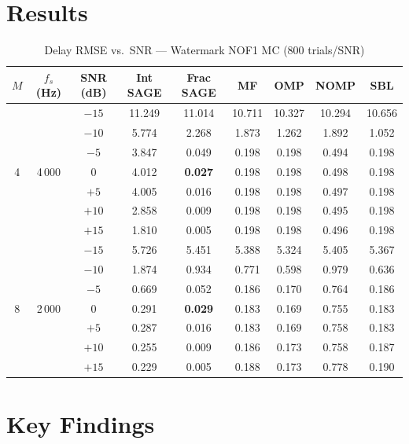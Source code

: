 \documentclass[11pt,a4paper]{article}
\begin{document}
\section{Results}

\begin{table}[ht]
\centering
\caption{Delay RMSE vs.\ SNR --- Watermark NOF1 MC (800 trials/SNR)}
\label{tab:summary}
\small
\begin{tabular}{@{}ccccccccc@{}}
\toprule
$M$ & $f_s$ (Hz) & SNR (dB) & Int SAGE & \textbf{Frac SAGE} & MF & OMP & NOMP & SBL \\
\midrule
\multirow{7}{*}{4} & \multirow{7}{*}{4\,000}
 & $-15$ & 11.249 & 11.014 & 10.711 & 10.327 & 10.294 & 10.656 \\
 & & $-10$ &  5.774 &  2.268 &  1.873 &  1.262 &  1.892 &  1.052 \\
 & & $ -5$ &  3.847 &  0.049 &  0.198 &  0.198 &  0.494 &  0.198 \\
 & & $  0$ &  4.012 &  \textbf{0.027} &  0.198 &  0.198 &  0.498 &  0.198 \\
 & & $ +5$ &  4.005 &  0.016 &  0.198 &  0.198 &  0.497 &  0.198 \\
 & & $+10$ &  2.858 &  0.009 &  0.198 &  0.198 &  0.495 &  0.198 \\
 & & $+15$ &  1.810 &  0.005 &  0.198 &  0.198 &  0.496 &  0.198 \\
\midrule
\multirow{7}{*}{8} & \multirow{7}{*}{2\,000}
 & $-15$ &  5.726 &  5.451 &  5.388 &  5.324 &  5.405 &  5.367 \\
 & & $-10$ &  1.874 &  0.934 &  0.771 &  0.598 &  0.979 &  0.636 \\
 & & $ -5$ &  0.669 &  0.052 &  0.186 &  0.170 &  0.764 &  0.186 \\
 & & $  0$ &  0.291 &  \textbf{0.029} &  0.183 &  0.169 &  0.755 &  0.183 \\
 & & $ +5$ &  0.287 &  0.016 &  0.183 &  0.169 &  0.758 &  0.183 \\
 & & $+10$ &  0.255 &  0.009 &  0.186 &  0.173 &  0.758 &  0.187 \\
 & & $+15$ &  0.229 &  0.005 &  0.188 &  0.173 &  0.778 &  0.190 \\
\bottomrule
\end{tabular}
\end{table}

\section{Key Findings}
\end{document}
